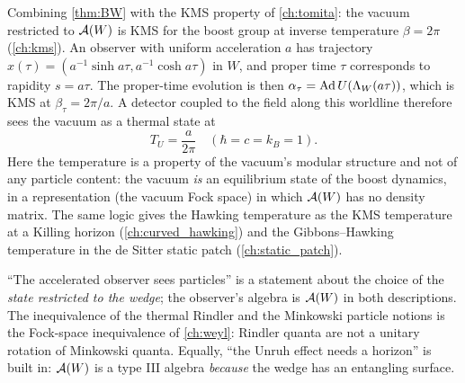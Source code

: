 Combining \cref{thm:BW} with the KMS property of \cref{ch:tomita}: the vacuum restricted to $\mathcal{A}(W)$ is KMS for the boost group at inverse temperature $\beta=2\pi$ (\cref{ch:kms}). An observer with uniform acceleration $a$ has trajectory $x(\tau)=(a^{-1}\sinh a\tau,a^{-1}\cosh a\tau)$ in $W$, and proper time $\tau$ corresponds to rapidity $s=a\tau$. The proper-time evolution is then $\alpha_\tau=\operatorname{Ad} U(\Lambda_W(a\tau))$, which is KMS at $\beta_\tau=2\pi/a$. A detector coupled to the field along this worldline therefore sees the vacuum as a thermal state at
\begin{equation}
T_U=\frac{a}{2\pi}\quad(\hbar=c=k_B=1).
\end{equation}
Here the temperature is a property of the vacuum's modular structure and not of any particle content: the vacuum \emph{is} an equilibrium state of the boost dynamics, in a representation (the vacuum Fock space) in which $\mathcal{A}(W)$ has no density matrix. The same logic gives the Hawking temperature as the KMS temperature at a Killing horizon (\cref{ch:curved_hawking}) and the Gibbons--Hawking temperature in the de Sitter static patch (\cref{ch:static_patch}).

\begin{whatwrong}
``The accelerated observer sees particles'' is a statement about the choice of the \emph{state restricted to the wedge}; the observer's algebra is $\mathcal{A}(W)$ in both descriptions. The inequivalence of the thermal Rindler and the Minkowski particle notions is the Fock-space inequivalence of \cref{ch:weyl}: Rindler quanta are not a unitary rotation of Minkowski quanta. Equally, ``the Unruh effect needs a horizon'' is built in: $\mathcal{A}(W)$ is a type III algebra \emph{because} the wedge has an entangling surface.
\end{whatwrong}

